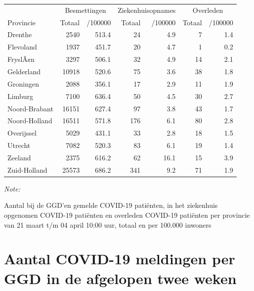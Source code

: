 \documentclass[
  english,
  man,floatsintext]{apa6}
\begin{document}
\begin{table}
\centering
\begin{threeparttable}
\begin{tabular}{lrrrrrr}
\toprule
\multicolumn{1}{c}{ } & \multicolumn{2}{c}{Besmettingen} & \multicolumn{2}{c}{Ziekenhuisopnames} & \multicolumn{2}{c}{Overleden} \\
\cmidrule(l{3pt}r{3pt}){2-3} \cmidrule(l{3pt}r{3pt}){4-5} \cmidrule(l{3pt}r{3pt}){6-7}
Provincie & Totaal & /100000 & Totaal & /100000 & Totaal & /100000\\
\midrule
Drenthe & 2540 & 513.4 & 24 & 4.9 & 7 & 1.4\\
Flevoland & 1937 & 451.7 & 20 & 4.7 & 1 & 0.2\\
FryslÃ¢n & 3297 & 506.1 & 32 & 4.9 & 14 & 2.1\\
Gelderland & 10918 & 520.6 & 75 & 3.6 & 38 & 1.8\\
Groningen & 2088 & 356.1 & 17 & 2.9 & 11 & 1.9\\
Limburg & 7100 & 636.4 & 50 & 4.5 & 30 & 2.7\\
Noord-Brabant & 16151 & 627.4 & 97 & 3.8 & 43 & 1.7\\
Noord-Holland & 16511 & 571.8 & 176 & 6.1 & 80 & 2.8\\
Overijssel & 5029 & 431.1 & 33 & 2.8 & 18 & 1.5\\
Utrecht & 7082 & 520.3 & 83 & 6.1 & 19 & 1.4\\
Zeeland & 2375 & 616.2 & 62 & 16.1 & 15 & 3.9\\
Zuid-Holland & 25573 & 686.2 & 341 & 9.2 & 71 & 1.9\\
\bottomrule
\end{tabular}
\begin{tablenotes}
\item \textit{Note: } 
\item Aantal bij de GGD’en gemelde COVID-19 patiënten, in het ziekenhuis opgenomen COVID-19 patiënten en overleden COVID-19 patiënten per provincie van 21 maart t/m 04 april 10:00 uur, totaal en per 100.000 inwoners
\end{tablenotes}
\end{threeparttable}
\end{table}

\newpage

\hypertarget{aantal-covid-19-meldingen-per-ggd-in-de-afgelopen-twee-weken}{%
\section{Aantal COVID-19 meldingen per GGD in de afgelopen twee weken}\label{aantal-covid-19-meldingen-per-ggd-in-de-afgelopen-twee-weken}}
\end{document}
